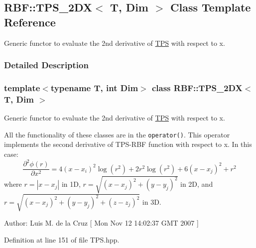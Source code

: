 \hypertarget{classRBF_1_1TPS__2DX}{
\subsection{RBF::TPS\_\-2DX$<$ T, Dim $>$ Class Template Reference}
\label{classRBF_1_1TPS__2DX}
}
Generic functor to evaluate the 2nd derivative of \hyperlink{classRBF_1_1TPS}{TPS} with respect to x.  




\subsubsection{Detailed Description}
\subsubsection*{template$<$typename T, int Dim$>$ class RBF::TPS\_\-2DX$<$ T, Dim $>$}

Generic functor to evaluate the 2nd derivative of \hyperlink{classRBF_1_1TPS}{TPS} with respect to x. 

All the functionality of these classes are in the {\tt operator()}. This operator implements the second derivative of TPS-RBF function with respect to x. In this case: \[ \frac{\partial^2 \phi(r)}{\partial x^2} = 4(x-x_i)^2\log(r^2) + 2r^2\log(r^2) + 6(x - x_j)^2 + r^2 \] where $ r = |x - x_j| $ in 1D, $ r = \sqrt{(x - x_j)^2 + (y - y_j)^2} $ in 2D, and $ r = \sqrt{(x - x_j)^2 + (y - y_j)^2 + (z - z_j)^2} $ in 3D.

\begin{Desc}
\item[Author:]Luis M. de la Cruz \mbox{[} Mon Nov 12 14:02:37 GMT 2007 \mbox{]} \end{Desc}


Definition at line 151 of file TPS.hpp.